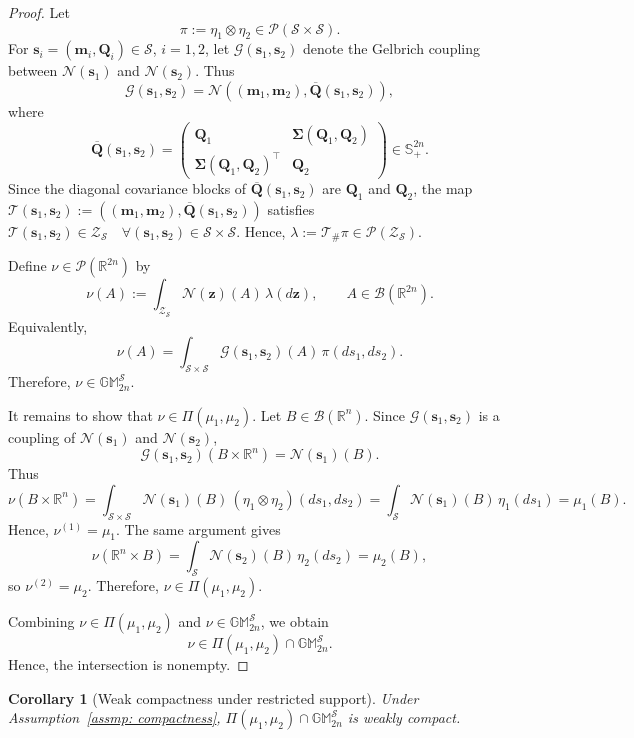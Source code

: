 \documentclass[opre,sglanonrev]{informs4}
\newtheorem{corollary}{Corollary}
\newcommand{\mN}{\mathcal{N}}
\newcommand{\mbR}{\mathbb R}
\newcommand{\mbS}{\mathbb S}
\newcommand{\mbGM}{\mathbb{GM}}
\newcommand{\bmean}{\bm{m}}
\newcommand{\bs}{\bm{s}}
\newcommand{\bz}{\bm{z}}
\newcommand{\bQ}{\bm Q}
\newcommand{\bSigma}{\bm{\Sigma}}
\begin{document}
{\begin{APPENDICES}
\begin{proof}
Let\vspace{-2em}
\[
\pi:=\eta_1\otimes\eta_2\in\mathcal P(\mathcal S\times\mathcal S).
\]
For \(\bs_i=(\bmean_i,\bQ_i)\in\mathcal S\), \(i=1,2\), let
\(\mathcal G(\bs_1,\bs_2)\) denote the Gelbrich coupling between
\(\mN(\bs_1)\) and \(\mN(\bs_2)\). Thus
\[
\mathcal G(\bs_1,\bs_2)
=
\mN\!\left(
(\bmean_1,\bmean_2),
\overline{\bQ}(\bs_1,\bs_2)
\right),
\]
where\vspace{-1.75em}
\[
\overline{\bQ}(\bs_1,\bs_2)
=
\begin{pmatrix}
\bQ_1 & \bSigma(\bQ_1,\bQ_2)\\
\boldsymbol\Sigma(\bQ_1,\bQ_2)^\top & \bQ_2
\end{pmatrix}
\in\mbS^{2n}_+.
\]
Since the diagonal covariance blocks of \(\overline{\bQ}(\bs_1,\bs_2)\) are
\(\bQ_1\) and \(\bQ_2\), the map $\mathcal T(\bs_1,\bs_2)
:=
\left(
(\bmean_1,\bmean_2),
\overline{\bQ}(\bs_1,\bs_2)
\right)$ satisfies $\mathcal T(\bs_1,\bs_2)\in\mathcal Z_{\mathcal S}
\quad
\forall (\bs_1,\bs_2)\in\mathcal S\times\mathcal S$. Hence, $\lambda:=\mathcal T_{\#}\pi\in\mathcal P(\mathcal Z_{\mathcal S})$. 

Define \(\nu\in\mathcal P(\mbR^{2n})\) by
\[
\nu(A):=\int_{\mathcal Z_{\mathcal S}}\mN(\bz)(A)\,\lambda(d\bz),
\qquad
A\in\mathcal B(\mbR^{2n}).
\]
Equivalently,
\[
\nu(A)
=
\int_{\mathcal S\times\mathcal S}
\mathcal G(\bs_1,\bs_2)(A)\,\pi(ds_1,ds_2).
\]
Therefore, \(\nu\in\mbGM_{2n}^{\mathcal S}\).

It remains to show that \(\nu\in\Pi(\mu_1,\mu_2)\). Let
\(B\in\mathcal B(\mbR^n)\). Since \(\mathcal G(\bs_1,\bs_2)\) is a coupling of
\(\mN(\bs_1)\) and \(\mN(\bs_2)\),
\[
\mathcal G(\bs_1,\bs_2)(B\times\mbR^n)
=
\mN(\bs_1)(B).
\]
Thus\vspace{-1.85em}
\[
\nu(B\times\mbR^n)
=
\int_{\mathcal S\times\mathcal S}
\mN(\bs_1)(B)\,(\eta_1\otimes\eta_2)(ds_1,ds_2)
=
\int_{\mathcal S}\mN(\bs_1)(B)\,\eta_1(ds_1)
=
\mu_1(B).
\]
Hence, \(\nu^{(1)}=\mu_1\). The same argument gives
\[
\nu(\mbR^n\times B)
=
\int_{\mathcal S}\mN(\bs_2)(B)\,\eta_2(ds_2)
=
\mu_2(B),
\]
so \(\nu^{(2)}=\mu_2\). Therefore, \(\nu\in\Pi(\mu_1,\mu_2)\).

Combining \(\nu\in\Pi(\mu_1,\mu_2)\) and
\(\nu\in\mbGM_{2n}^{\mathcal S}\), we obtain
\[
\nu\in\Pi(\mu_1,\mu_2)\cap\mbGM_{2n}^{\mathcal S}.
\]
Hence, the intersection is nonempty.
\end{proof}

\begin{corollary}[Weak compactness under restricted support]
\label{cor:restricted-intersection-weak-compact}
Under Assumption~\ref{assmp: compactness}, $\Pi(\mu_1,\mu_2)\cap\mbGM_{2n}^{\mathcal S}$ is weakly compact.
\end{corollary}


\end{APPENDICES}}
\end{document}
